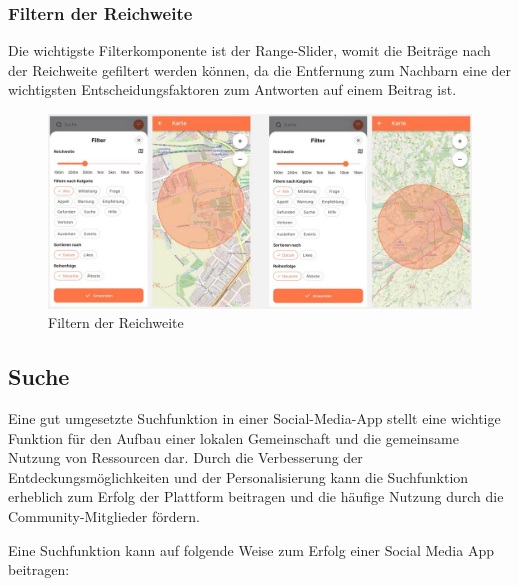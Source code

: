 \subsubsection{Filtern der Reichweite}

Die wichtigste Filterkomponente ist der Range-Slider, womit die Beiträge nach der Reichweite gefiltert werden können, da die Entfernung zum Nachbarn eine der wichtigsten Entscheidungsfaktoren zum Antworten auf einem Beitrag ist.

\begin{figure}[h]
  \centering
  \includegraphics[width=\textwidth]{pics/range-filter.JPG}
  \caption{Filtern der Reichweite}
\end{figure}

\subsection{Suche}

Eine gut umgesetzte Suchfunktion in einer Social-Media-App stellt eine wichtige Funktion für den Aufbau einer lokalen Gemeinschaft und die gemeinsame Nutzung von Ressourcen dar. Durch die Verbesserung der Entdeckungsmöglichkeiten und der Personalisierung kann die Suchfunktion erheblich zum Erfolg der Plattform beitragen und die häufige Nutzung durch die Community-Mitglieder fördern.

Eine Suchfunktion kann auf folgende Weise zum Erfolg einer Social Media App beitragen:

